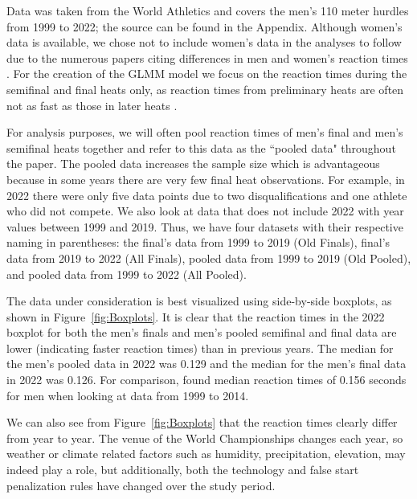 \documentclass[12pt, letterpaper, titlepage]{article}
\newcommand{\of}[1]{\textcolor{violet}{OF: #1}}
\begin{document}
Data was taken from the World Athletics 
and covers the men's 110 meter hurdles from 1999 to 2022; the source can be 
found in the Appendix.
Although women's data is available, we chose not to include women's data in the
analyses to follow due to the numerous papers citing differences in men and
women's reaction times \citep[e.g.,][]{lipps2011implications, 
babicc2009reaction, panoutsakopoulos2020gender}.
For the creation of the GLMM model we focus on the reaction times during the 
semifinal and final heats only, as reaction times from preliminary heats are 
often not as fast as those in later heats \citep[e.g.,][]{zhang2021correlation}. 

For analysis purposes, we will often pool reaction times of men's final and 
men's semifinal heats together and refer to this data as the ``pooled data"
throughout the paper. 
The pooled data increases the sample size which is advantageous because in some
years there are very few final heat observations.  For example, in 2022 there
were only five data points due to two disqualifications and one athlete who 
did not compete.  We also look at data that does not include 2022 with year values
between 1999 and 2019.  Thus, we have four datasets with their respective naming
in parentheses: the final's data from 1999 to 2019 (Old Finals), final's data 
from 2019 to 2022 (All Finals), pooled data from 1999 to 2019 (Old Pooled), and 
pooled data from 1999 to 2022 (All Pooled).

The data under consideration is best visualized using side-by-side boxplots, as
shown in Figure~\ref{fig:Boxplots}.  It is clear that the reaction times in the 
2022 boxplot for both 
the men's finals and men's pooled semifinal and final data are lower (indicating 
faster reaction times)
than in previous years.  The median for the men's pooled data in 2022 was 0.129
and the median for the men's final data in 2022 was 0.126.  For comparison,
\citet{brosnan2017effects} found median reaction times of 0.156 seconds 
for men when looking at data from 1999 to 2014.

We can also see from Figure~\ref{fig:Boxplots} that the reaction times clearly
differ from year to year. The venue of the World Championships changes each 
year, so weather or climate related factors such as humidity, precipitation, 
elevation, may indeed play a role, but additionally, both the technology and 
false start penalization rules have changed over the study period.
\end{document}
